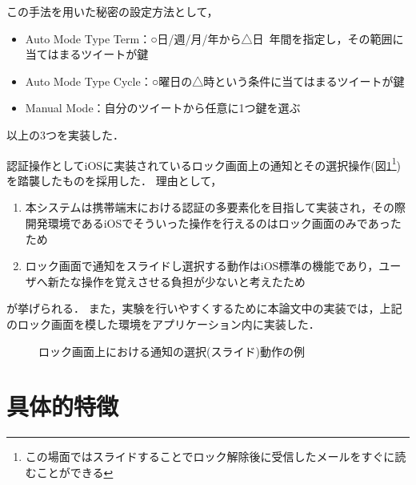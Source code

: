 この手法を用いた秘密の設定方法として，
\begin{itemize}
\item Auto Mode Type Term：○日/週/月/年から△日~年間を指定し，その範囲に当てはまるツイートが鍵
\item Auto Mode Type Cycle：○曜日の△時という条件に当てはまるツイートが鍵
\item Manual Mode：自分のツイートから任意に1つ鍵を選ぶ
\end{itemize}
以上の3つを実装した．

認証操作としてiOSに実装されているロック画面上の通知とその選択操作(図\ref{fig:notificationSliding}\footnote{この場面ではスライドすることでロック解除後に受信したメールをすぐに読むことができる})を踏襲したものを採用した．
理由として，
\begin{enumerate}
\item 本システムは携帯端末における認証の多要素化を目指して実装され，その際開発環境であるiOSでそういった操作を行えるのはロック画面のみであったため
\item ロック画面で通知をスライドし選択する動作はiOS標準の機能であり，ユーザへ新たな操作を覚えさせる負担が少ないと考えたため
\end{enumerate}
が挙げられる．
また，実験を行いやすくするために本論文中の実装では，上記のロック画面を模した環境をアプリケーション内に実装した．

\begin{figure}[ht]
\begin{center}
\end{center}
\caption{ロック画面上における通知の選択(スライド)動作の例}
\label{fig:notificationSliding}
\end{figure}

\section{具体的特徴}\label{sec:feature}


\newpage

